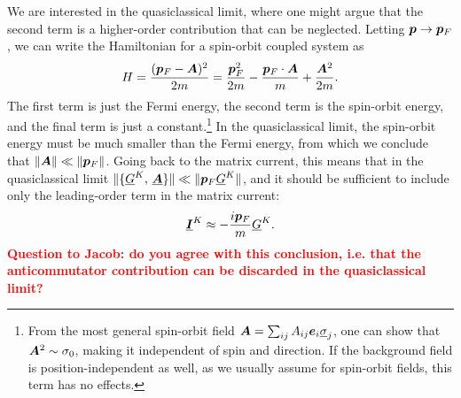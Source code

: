 We are interested in the quasiclassical limit, where one might argue that the second term is a higher-order contribution that can be neglected.
Letting $\bm{p} \rightarrow \bm{p}_F$, we can write the Hamiltonian for a spin-orbit coupled system as
\begin{equation}
  H = \frac{(\bm{p}_F - \bm{A})^2}{2m} = \frac{\bm{p}_F^2}{2m} - \frac{\bm{p}_F\cdot\bm{A}}{m} + \frac{\bm{A}^2}{2m} .
\end{equation}
The first term is just the Fermi energy, the second term is the spin-orbit energy, and the final term is just a constant.\footnote{From the most general spin-orbit field $\bm{A} = \sum_{ij} A_{ij} \bm{e}_i \underline{\sigma}_j$, one can show that ${\bm{A}^2 \sim \sigma_0}$, making it independent of spin and direction. If the background field is position-independent as well, as we usually assume for spin-orbit fields, this term has no effects.}
In the quasiclassical limit, the spin-orbit energy must be much smaller than the Fermi energy, from which we conclude that $\|\bm{A}\| \ll \|\bm{p}_F\|$.
Going back to the matrix current, this means that in the quasiclassical limit $\|\{\underline{G}^K,\, \underline{\bm{A}}\}\| \ll \|\bm{p}_F\underline{G}^K\|$, and it should be sufficient to include only the leading-order term in the matrix current:
\begin{equation}
  \underline{\bm{I}}^K \approx -\frac{i\bm{p}_F}{m} \underline{G}^K .
\end{equation}
\textcolor{red}{\textbf{Question to Jacob: do you agree with this conclusion, i.e. that the anticommutator contribution can be discarded in the quasiclassical limit?}}





